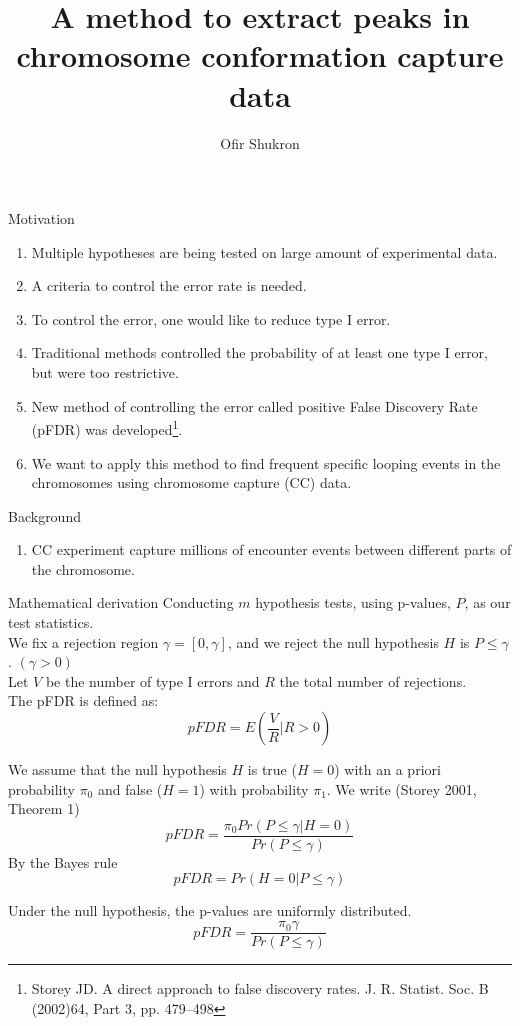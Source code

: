 \documentclass[8pt]{beamer}
\title{A method to extract peaks in chromosome conformation capture data}
\author{Ofir Shukron}
\begin{document}
\begin{frame}
\titlepage
\end{frame}

\begin{frame}{Motivation}
\begin{enumerate}
\item Multiple hypotheses are being tested on large amount of experimental data. 
\item A criteria to control the error rate is needed.
\item To control the error, one would like to reduce type I error. 
\item Traditional methods controlled the probability of at least one type I error, but were too restrictive.
\item New method of controlling the error called positive False Discovery Rate (pFDR) was developed\footnote{Storey JD. A direct approach to false discovery rates. J. R. Statist. Soc. B (2002)64, Part 3, pp. 479–498}. 
\item We want to apply this method to find frequent specific looping events in the chromosomes using chromosome capture (CC) data.
\end{enumerate}
\end{frame}

\begin{frame}{Background}
\begin{enumerate}
\item CC experiment capture millions of encounter events between different parts of the chromosome. 
\end{enumerate}
\end{frame}

\begin{frame}{Mathematical derivation}
Conducting $m$ hypothesis tests, using p-values, $P$, as our test statistics.\\
We fix a rejection region $\gamma=[0, \gamma]$, and we reject the null hypothesis $H$ is $P\leq\gamma$. $(\gamma>0)$\\
Let $V$ be the number of type I errors and $R$ the total number of rejections.\\
The pFDR is defined as: 
\begin{equation*}
pFDR=E\left(\frac{V}{R}| R>0 \right)
\end{equation*}

We assume that the null hypothesis $H$ is true ($H=0$) with an a priori probability $\pi_0$ and false ($H=1$) with probability $\pi_1$. We write (Storey 2001, Theorem 1)\\
\begin{equation*}
pFDR=\frac{\pi_0 Pr(P\leq\gamma|H=0)}{Pr(P\leq\gamma)}
\end{equation*}
By the Bayes rule 
\begin{equation*}
pFDR = Pr(H=0|P\leq\gamma)
\end{equation*}

Under the null hypothesis, the p-values are uniformly distributed. 
\begin{equation*}
pFDR=\frac{\pi_0\gamma}{Pr(P\leq\gamma)}
\end{equation*} 
\end{frame}
\end{document}
